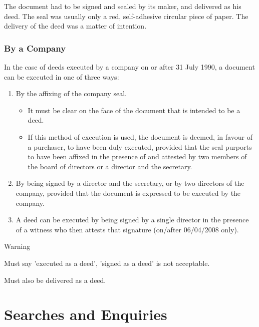 \documentclass[
]{article}
\providecommand{\tightlist}{%
  \setlength{\itemsep}{0pt}\setlength{\parskip}{0pt}}
\newenvironment{env-6551cd31-4c34-4de5-9b70-48dd453ea5fd}
{
    \savenotes\tcolorbox[blanker,breakable,left=5pt,borderline west={2pt}{-4pt}{orange}]
}
{
    \endtcolorbox\spewnotes
}
\begin{document}
The document had to be signed and sealed by its maker, and delivered as
his deed. The seal was usually only a red, self-adhesive circular piece
of paper. The delivery of the deed was a matter of intention.

\hypertarget{by-a-company}{%
\subsubsection{By a Company}\label{by-a-company}}

In the case of deeds executed by a company on or after 31 July 1990, a
document can be executed in one of three ways:

\begin{enumerate}
\tightlist
\item
  By the affixing of the company seal.

  \begin{itemize}
  \tightlist
  \item
    It must be clear on the face of the document that is intended to be
    a deed.
  \item
    If this method of execution is used, the document is deemed, in
    favour of a purchaser, to have been duly executed, provided that the
    seal purports to have been affixed in the presence of and attested
    by two members of the board of directors or a director and the
    secretary.
  \end{itemize}
\item
  By being signed by a director and the secretary, or by two directors
  of the company, provided that the document is expressed to be executed
  by the company.
\item
  A deed can be executed by being signed by a single director in the
  presence of a witness who then attests that signature (on/after
  06/04/2008 only).
\end{enumerate}

\begin{env-6551cd31-4c34-4de5-9b70-48dd453ea5fd}

Warning

Must say 'executed as a deed', 'signed as a deed' is not acceptable.

\end{env-6551cd31-4c34-4de5-9b70-48dd453ea5fd}

Must also be delivered as a deed.

\hypertarget{searches-and-enquiries}{%
\section{Searches and Enquiries}\label{searches-and-enquiries}}
\end{document}
